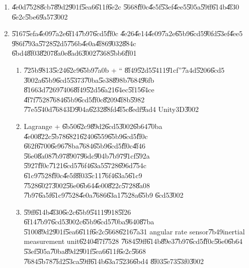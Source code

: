 \begin{enumerate}
\item \U{4e0d}\U{7528}\U{8cb7}\U{89d2}\U{901f}\U{5ea6}\U{611f}\U{6e2c}%
\U{5668}\U{ff0c}\U{4e5f}\U{53ef}\U{4ee5}\U{505a}\U{59ff}\U{614b}\U{4f30}%
\U{6e2c}\U{5be6}\U{9a57}\U{3002}

\item \U{5167}\U{5efa}\U{4e09}\U{7a2e}\U{6f14}\U{7b97}\U{6cd5}\U{ff0c}%
\U{4e26}\U{4e14}\U{4e09}\U{7a2e}\U{65b9}\U{6cd5}\U{90fd}\U{53ef}\U{4ee5}%
\U{986f}\U{793a}\U{5728}\U{52d5}\U{756b}\U{4e0a}\U{4f86}\U{9032}\U{884c}%
\U{6bd4}\U{8f03}\U{8207}\U{8a0e}\U{8ad6}\U{3002}\U{7368}\U{5bb6}\U{ff01}

\begin{enumerate}
\item \U{725b}\U{9813}\U{5c24}\U{62c9}\U{65b9}\U{7a0b} + \textquotedblleft 
\U{8f49}\U{52d5}\U{5411}\U{91cf}\textquotedblright \U{7a4d}\U{5206}\U{6cd5}%
\U{3002}a\U{65b9}\U{6cd5}\U{5373}\U{70ba}\U{5e38}\U{898b}\U{7684}\U{96fb}%
\U{8166}3d\U{7269}\U{7406}\U{8f49}\U{52d5}\U{6a21}\U{64ec}\U{5f15}\U{64ce}%
\U{4f7f}\U{7528}\U{7684}\U{65b9}\U{6cd5}\U{ff0c}\U{8209}\U{4f8b}\U{5982}%
\U{77e5}\U{540d}\U{7684}3D\U{904a}\U{6232}\U{88fd}\U{4f5c}\U{8edf}\U{9ad4}%
Unity3D\U{3002}

\item Lagrange + \U{6b50}\U{62c9}\U{89d2}\U{6cd5}\U{3002}\U{6b64}\U{70ba}%
\U{4e00}\U{822c}\U{5b78}\U{6821}\U{6240}\U{6559}\U{65b9}\U{6cd5}\U{ff0c}%
\U{662f}\U{6700}\U{6e96}\U{78ba}\U{7684}\U{65b9}\U{6cd5}\U{ff0c}\U{4f46}%
\U{56e0}\U{8a08}\U{7b97}\U{8907}\U{96dc}\U{904b}\U{7b97}\U{91cf}\U{592a}%
\U{5927}\U{ff0c}\U{7121}\U{6cd5}\U{76f4}\U{63a5}\U{5728}\U{696d}\U{754c}%
\U{61c9}\U{7528}\U{ff0c}\U{4e5f}\U{8f03}\U{5c11}\U{76f4}\U{63a5}\U{61c9}%
\U{7528}\U{6027}\U{3002}\U{56e0}\U{6b64}\U{4e00}\U{822c}\U{5728}\U{8a08}%
\U{7b97}\U{6a5f}\U{61c9}\U{7528}\U{4e0a}\U{7686}\U{63a1}\U{7528}a\U{65b9}%
\U{6cd5}\U{3002}

\item \U{59ff}\U{614b}\U{4f30}\U{6e2c}\U{65b9}\U{5411}\U{9918}\U{5f26}%
\U{6f14}\U{7b97}\U{6cd5}\U{3002}c\U{65b9}\U{6cd5}\U{70ba}\U{9640}\U{87ba}%
\U{5100}\U{89d2}\U{901f}\U{5ea6}\U{611f}\U{6e2c}\U{5668}\U{6216}\U{7a31}%
angular rate sensor\U{7b49}inertial measurement unit\U{6240}\U{4f7f}\U{7528}%
\U{7684}\U{59ff}\U{614b}\U{89e3}\U{7b97}\U{6cd5}\U{ff0c}\U{56e0}\U{6b64}%
\U{53ef}\U{505a}\U{70ba}\U{89d2}\U{901f}\U{5ea6}\U{611f}\U{6e2c}\U{5668}%
\U{7684}\U{5b78}\U{7fd2}\U{53ca}\U{59ff}\U{614b}\U{63a7}\U{5236}\U{6bd4}%
\U{8f03}\U{5e73}\U{53f0}\U{3002}
\end{enumerate}


\end{enumerate}
